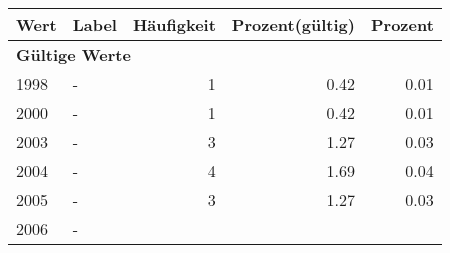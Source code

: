      \begin{longtable}{lXrrr}
     \toprule
     \textbf{Wert} & \textbf{Label} & \textbf{Häufigkeit} & \textbf{Prozent(gültig)} & \textbf{Prozent} \\
     \endhead
     \midrule
     \multicolumn{5}{l}{\textbf{Gültige Werte}}\\

     1998 &
     \multicolumn{1}{X}{ -  } &


       \num{1} &
       \num[round-mode=places,round-precision=2]{0.42} &
         \num[round-mode=places,round-precision=2]{0.01} \\

     2000 &
     \multicolumn{1}{X}{ -  } &


       \num{1} &
       \num[round-mode=places,round-precision=2]{0.42} &
         \num[round-mode=places,round-precision=2]{0.01} \\

     2003 &
     \multicolumn{1}{X}{ -  } &


       \num{3} &
       \num[round-mode=places,round-precision=2]{1.27} &
         \num[round-mode=places,round-precision=2]{0.03} \\

     2004 &
     \multicolumn{1}{X}{ -  } &


       \num{4} &
       \num[round-mode=places,round-precision=2]{1.69} &
         \num[round-mode=places,round-precision=2]{0.04} \\

     2005 &
     \multicolumn{1}{X}{ -  } &


       \num{3} &
       \num[round-mode=places,round-precision=2]{1.27} &
         \num[round-mode=places,round-precision=2]{0.03} \\

     2006 &
     \multicolumn{1}{X}{ -  } &



\end{longtable}

